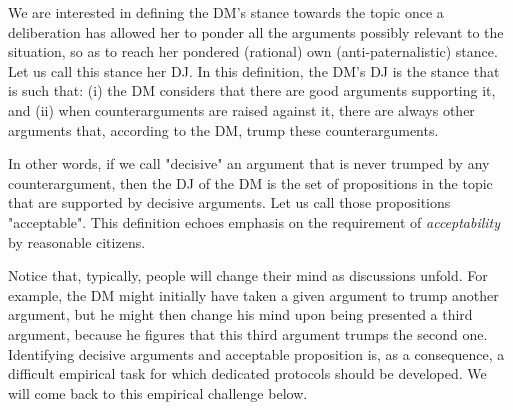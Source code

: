 \documentclass[version=3.21, pagesize, twoside=off, bibliography=totoc, DIV=calc, fontsize=12pt, a4paper, french, english]{scrartcl}
\begin{document}
We are interested in defining the \ac{DM}’s stance towards the topic once a deliberation has allowed her to ponder all the arguments possibly relevant to the situation, so as to reach her pondered (rational) own (anti-paternalistic) stance. Let us call this stance her \ac{DJ}. In this definition, the \ac{DM}’s \ac{DJ} is the stance that is such that: (i) the \ac{DM} considers that there are good arguments supporting it, and (ii) when counterarguments are raised against it, there are always other arguments that, according to the \ac{DM}, trump these counterarguments.

In other words, if we call "decisive" an argument that is never trumped by any counterargument, then the \ac{DJ} of the \ac{DM} is the set of propositions in the topic that are supported by decisive arguments. Let us call those propositions "acceptable". This definition echoes  emphasis on the requirement of \emph{acceptability} by reasonable citizens. 


Notice that, typically, people will change their mind as discussions unfold. For example, the \ac{DM} might initially have taken a given argument to trump another argument, but he might then change his mind upon being presented a third argument, because he figures that this third argument trumps the second one. Identifying decisive arguments and acceptable proposition is, as a consequence, a difficult empirical task for which dedicated protocols should be developed. We will come back to this empirical challenge below.
\end{document}
